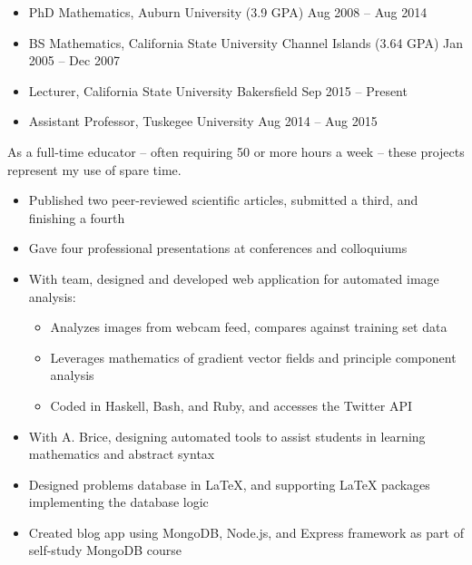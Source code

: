 \documentclass[10pt]{article}
\begin{document}
\makeletterhead



\vfill
{}

  \begin{itemize}
    \item{
      PhD Mathematics, Auburn University (3.9 GPA)
      \hfill Aug 2008 -- Aug 2014
    }
    \item{
      BS Mathematics, California State University Channel Islands (3.64 GPA)
      \hfill Jan 2005 -- Dec 2007
    }
  \end{itemize}



\vfill
{}

  \begin{itemize}
    \item{
      Lecturer, California State University Bakersfield
      \hfill Sep 2015 -- Present
    }
    \item{
      Assistant Professor, Tuskegee University
      \hfill Aug 2014 -- Aug 2015
    }
  \end{itemize}



\vfill
{}

  As a full-time educator --
  often requiring 50 or more hours a week --
  these projects represent my use of spare time.

  \begin{itemize}
    \item{
      Published two peer-reviewed scientific articles,
      submitted a third, and finishing a fourth
    }
    \item{
      Gave four professional presentations at conferences and colloquiums
    }
    \item{
      With team, designed and developed web application
      for automated image analysis:
      \begin{itemize}
        \item{
          Analyzes images from webcam feed, compares against training set data
        }
        \item{
          Leverages mathematics of gradient vector fields
          and principle component analysis
        }
        \item{
          Coded in Haskell, Bash, and Ruby,
          and accesses the Twitter API
        }
      \end{itemize}
    }
    \item{
      With A. Brice, designing automated tools to assist students
      in learning mathematics and abstract syntax
    }
    \item{
      Designed problems database in LaTeX,
      and supporting LaTeX packages implementing the database logic
    }
    \item{
      Created blog app using MongoDB, Node.js, and Express framework
      as part of self-study MongoDB course
    }
  \end{itemize}
\end{document}
